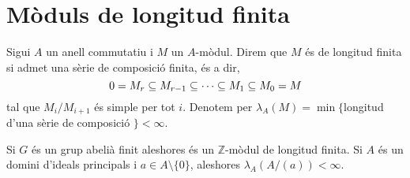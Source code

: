 \documentclass[../../../main.tex]{subfiles}
\begin{document}
\section{Mòduls de longitud finita}


\begin{defi}
\label{def:modulDimensioFinita} Sigui $A$ un anell commutatiu i $M$ un $A$-mòdul. Direm que $M$ és de longitud finita si admet una sèrie de composició finita, és a dir, 
\begin{equation}
    \notag
    0 = M_r\subseteq M_{r-1}\subseteq\cdots\subseteq M_1\subseteq M_0 = M
\end{equation}
tal que $M_i/M_{i+1}$ és simple per tot $i$. Denotem per $\lambda_A(M) = \min\{$longitud d'una sèrie de composició $\}<\infty$.
\end{defi}

\begin{ej}
Si $G$ és un grup abelià finit aleshores és un $\mathbb{Z}$-mòdul de longitud finita. Si $A$ és un domini d'ideals principals i $a\in A\setminus \{0\}$, aleshores $\lambda_A(A/(a))<\infty$.
\end{ej}
\end{document}
